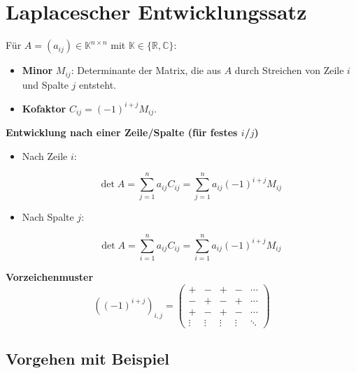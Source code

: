 \documentclass[a4paper,11pt,oneside,open=any,parskip=half, DIV=15]{scrreprt}
\begin{document}
\newpage
        
\section{Laplacescher Entwicklungssatz}

   Für \(A=(a_{ij}) \in \mathbb{K}^{n \times n}\) mit \(\mathbb{K}\in\{\mathbb{R},\mathbb{C}\}\):

   \begin{itemize}
      \item \textbf{Minor} \( M_{ij} \): Determinante der Matrix, die aus \(A\) durch Streichen von Zeile \(i\) und Spalte \(j\) entsteht.
      \item \textbf{Kofaktor} \(C_{ij} = (-1)^{i+j} M_{ij}\). %
   \end{itemize}

   \textbf{Entwicklung nach einer Zeile/Spalte (für festes \(i\)/\(j\))}

   \begin{itemize}
      \item Nach Zeile \(i\):
            \begin{importantbox}
               \[
                  \det A = \sum_{j=1}^{n} a_{ij} C_{ij} = \sum_{j=1}^{n} a_{ij} (-1)^{i+j} M_{ij}
               \]
            \end{importantbox}


      \item Nach Spalte \(j\):
            \begin{importantbox}
               \[
                  \det A = \sum_{i=1}^{n} a_{ij} C_{ij} = \sum_{i=1}^{n} a_{ij} (-1)^{i+j} M_{ij}
               \]
            \end{importantbox}

   \end{itemize}

   \textbf{Vorzeichenmuster}
   \[
      \left((-1)^{i+j}\right)_{i,j} =
            \begin{pmatrix}
               + & - & + & - & \cdots \\
               - & + & - & + & \cdots \\
               + & - & + & - & \cdots \\
               \vdots & \vdots & \vdots & \vdots & \ddots
            \end{pmatrix}
   \]

   \subsection*{Vorgehen mit Beispiel}
\end{document}
